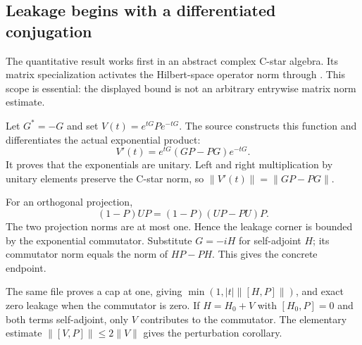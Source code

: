 \subsection{Leakage begins with a differentiated conjugation}
The quantitative result works first in an abstract complex C-star algebra. Its matrix specialization activates the Hilbert-space operator norm through . This scope is essential: the displayed bound is not an arbitrary entrywise matrix norm estimate.

Let $G^*=-G$ and set $V(t)=e^{tG}Pe^{-tG}$. The source constructs this function and differentiates the actual exponential product:
\[
V'(t)=e^{tG}(GP-PG)e^{-tG}.
\]
It proves that the exponentials are unitary. Left and right multiplication by unitary elements preserve the C-star norm, so $\|V'(t)\|=\|GP-PG\|$.



For an orthogonal projection,
\[
(1-P)UP=(1-P)(UP-PU)P.
\]
The two projection norms are at most one. Hence the leakage corner is bounded by the exponential commutator. Substitute $G=-iH$ for self-adjoint $H$; its commutator norm equals the norm of $HP-PH$. This gives the concrete endpoint.



The same file proves a cap at one, giving $\min(1,|t|\|[H,P]\|)$, and exact zero leakage when the commutator is zero. If $H=H_0+V$ with $[H_0,P]=0$ and both terms self-adjoint, only $V$ contributes to the commutator. The elementary estimate $\|[V,P]\|\le2\|V\|$ gives the perturbation corollary.

